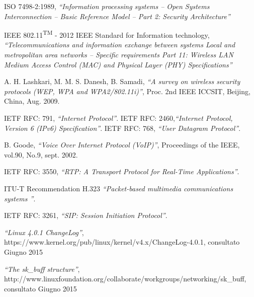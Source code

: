 
\begin{thebibliography}{90}   
\rhead[\fancyplain{}{\bfseries \leftmark}]{\fancyplain{}{\bfseries
\thepage}}


 ISO 7498-2:1989, \textit{``Information processing systems -- Open Systems Interconnection -- Basic Reference Model -- Part 2: Security Architecture''}

 IEEE 802.11\textsuperscript{TM} - 2012 IEEE Standard for Information technology, \textit{``Telecommunications and information exchange between systems Local and metropolitan area networks -- Specific requirements Part 11: Wireless LAN Medium Access Control (MAC) and Physical Layer (PHY) Specifications''}

 A. H. Lashkari, M. M. S. Danesh, B. Samadi, \textit{``A survey on wireless security protocols (WEP, WPA and WPA2/802.11i)''}, Proc. 2nd IEEE ICCSIT, Beijing, China, Aug. 2009.

 IETF RFC: 791, \textit{``Internet Protocol''}.
 IETF RFC: 2460,\textit{``Internet Protocol, Version 6 (IPv6) Specification''}.
 IETF RFC: 768, \textit{``User Datagram Protocol''}.

 B. Goode, \textit{``Voice Over Internet Protocol (VoIP)''}, Proceedings of the IEEE, vol.90, No.9, sept. 2002.

 IETF RFC: 3550, \textit{``RTP: A Transport Protocol for Real-Time Applications''}.

 ITU-T Recommendation H.323 \textit{``Packet-based multimedia communications systems ''}.

 IETF RFC: 3261, \textit{``SIP: Session Initiation Protocol''}.


 \textit{``Linux 4.0.1 ChangeLog''}, https://www.kernel.org/pub/linux/kernel/v4.x/ChangeLog-4.0.1, consultato Giugno 2015

 \textit{``The sk\_buff structure''}, http://www.linuxfoundation.org/collaborate/workgroups/networking/sk\_buff, consultato Giugno 2015



\end{thebibliography}
